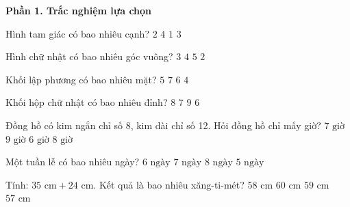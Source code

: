 \textbf{Phần 1. Trắc nghiệm lựa chọn}

\begin{ex} %
Hình tam giác có bao nhiêu cạnh?
\choice
{$2$}
{$4$}
{$1$}
{\True $3$}
\end{ex}

\begin{ex} %
Hình chữ nhật có bao nhiêu góc vuông?
\choice
{$3$}
{\True $4$}
{$5$}
{$2$}
\end{ex}

\begin{ex} %
Khối lập phương có bao nhiêu mặt?
\choice
{$5$}
{$7$}
{\True $6$}
{$4$}
\end{ex}

\begin{ex} %
Khối hộp chữ nhật có bao nhiêu đỉnh?
\choice
{\True $8$}
{$7$}
{$9$}
{$6$}
\end{ex}

\begin{ex} %
Đồng hồ có kim ngắn chỉ số 8, kim dài chỉ số 12. Hỏi đồng hồ chỉ mấy giờ?
\choice
{$7\text{ giờ}$}
{$9\text{ giờ}$}
{$6\text{ giờ}$}
{\True $8\text{ giờ}$}
\end{ex}

\begin{ex} %
Một tuần lễ có bao nhiêu ngày?
\choice
{$6\text{ ngày}$}
{\True $7\text{ ngày}$}
{$8\text{ ngày}$}
{$5\text{ ngày}$}
\end{ex}

\begin{ex} %
Tính: $35\text{ cm} + 24\text{ cm}$. Kết quả là bao nhiêu xăng-ti-mét?
\choice
{$58\text{ cm}$}
{$60\text{ cm}$}
{\True $59\text{ cm}$}
{$57\text{ cm}$}
\end{ex}

